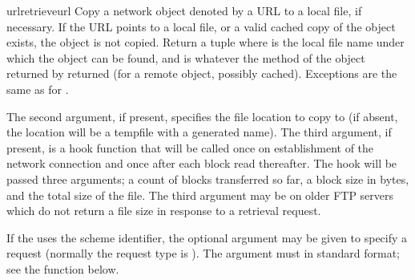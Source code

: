 \begin{funcdesc}{urlretrieve}{url}
Copy a network object denoted by a URL to a local file, if necessary.
If the URL points to a local file, or a valid cached copy of the
object exists, the object is not copied.  Return a tuple
 where  is the
local file name under which the object can be found, and 
is whatever the  method of the object returned by
 returned (for a remote object, possibly cached).
Exceptions are the same as for .

The second argument, if present, specifies the file location to copy
to (if absent, the location will be a tempfile with a generated name).
The third argument, if present, is a hook function that will be called
once on establishment of the network connection and once after each
block read thereafter.  The hook will be passed three arguments; a
count of blocks transferred so far, a block size in bytes, and the
total size of the file.  The third argument may be  on older
FTP servers which do not return a file size in response to a retrieval
request.

If the  uses the  scheme identifier, the optional
 argument may be given to specify a  request
(normally the request type is ).  The  argument
must in standard  format;
see the  function below.


\end{funcdesc}

